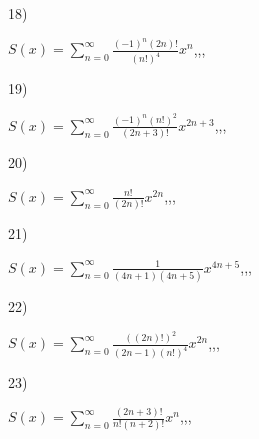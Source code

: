 \documentclass[11pt, ukrainian]{article}
\begin{document}
\par
\vspace{0.9cm}
18) \space 
{%
{$S(x)=\sum\limits_{n=0}^{\infty}{\frac{{(-1)^n}(2n)!}{(n!)^4}}{x^{{n}}}$},,, \par \smallskip  
}
\par
\vspace{0.9cm}
19) \space 
{%
{$S(x)=\sum\limits_{n=0}^{\infty}{\frac{{(-1)^n}{(n!)^2}}{(2n+3)!}}{x^{{2n+3}}}$},,, \par \smallskip  
}
\par
\vspace{0.9cm}
20) \space 
{%
{$S(x)=\sum\limits_{n=0}^{\infty}{\frac{n!}{(2n)!}}{x^{{2n}}}$},,, \par \smallskip  
}
\par
\vspace{0.9cm}
21) \space 
{%
{$S(x)=\sum\limits_{n=0}^{\infty}{\frac{1}{(4n+1)(4n+5)}}{x^{{4n+5}}}$},,, \par \smallskip  
}
\par
\vspace{0.9cm}
22) \space 
{%
{$S(x)=\sum\limits_{n=0}^{\infty}{\frac{((2n)!)^2}{(2n-1)(n!)^4}}{x^{{2n}}}$},,, \par \smallskip  
}
\par
\vspace{0.9cm}
23) \space 
{%
{$S(x)=\sum\limits_{n=0}^{\infty}{\frac{(2n+3)!}{n!(n+2)!}}{x^{n}}$},,, \par \smallskip  
}
\end{document}
